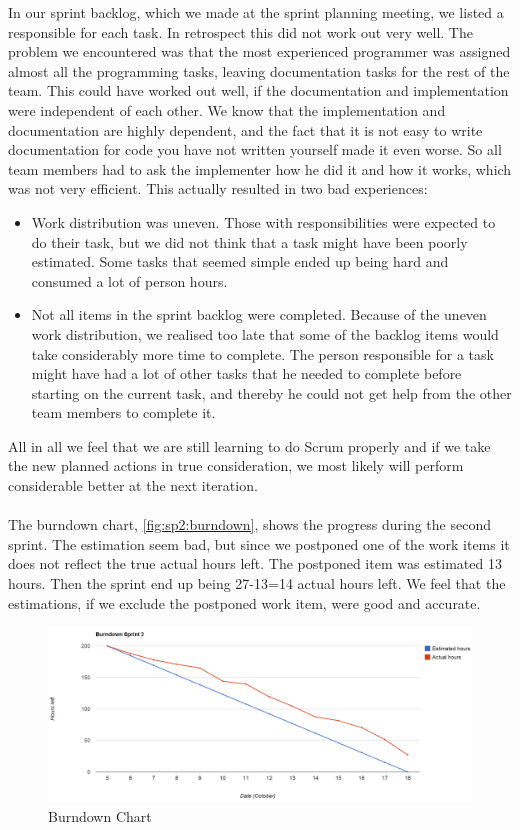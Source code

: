 In our sprint backlog, which we made at the sprint planning meeting, we listed a responsible for each task. In retrospect this did not work out very well. The problem we encountered was that the most experienced programmer was assigned almost all the programming tasks, leaving documentation tasks for the rest of the team. This could have worked out well, if the documentation and implementation were independent of each other. We know that the implementation and documentation are highly dependent, and the fact that it is not easy to write documentation for code you have not written yourself made it even worse. So all team members had to ask the implementer how he did it and how it works, which was not very efficient. 
This actually resulted in two bad experiences:
\begin{itemize}
\item Work distribution was uneven. Those with responsibilities were expected to do their task, but we did not think that a task might have been poorly estimated. Some tasks that seemed simple ended up being hard and consumed a lot of person hours.
\item Not all items in the sprint backlog were completed. Because of the uneven work distribution, we realised too late that some of the backlog items would take considerably more time to complete. The person responsible for a task might have had a lot of other tasks that he needed to complete before starting on the current task, and thereby he could not get help from the other team members to complete it.
\end{itemize} 
 All in all we feel that we are still learning to do Scrum properly and if we take the new planned actions in true consideration, we most likely will perform considerable better at the next iteration. 
\\
\\
The burndown chart, \autoref{fig:sp2:burndown}, shows the progress during the second sprint. The estimation seem bad, but since we postponed one of the work items it does not reflect the true actual hours left. The postponed item was estimated 13 hours. Then the sprint end up being 27-13=14 actual hours left. We feel that the estimations, if we exclude the postponed work item, were good and accurate.
\begin{figure}[!htb]
	\includegraphics[width=\textwidth]{./sprints/img/burndown_chart_s2}
	\caption{Burndown Chart\label{fig:sp2:burndown}}
\end{figure}

